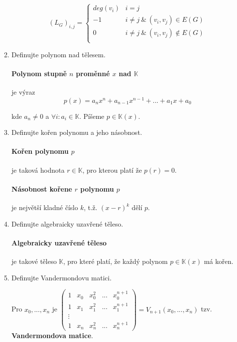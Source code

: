 \documentclass[10pt,a4paper]{article}
\theoremstyle{plain}
\begin{document}
\begin{enumerate}
\[ (L_G)_{i,j} = \begin{cases}  deg(v_i) & i = j  \\ 
								-1 & i \neq j \ \&\  (v_i, v_j) \in E(G) \\ 
								0  & i \neq j \ \&\  (v_i, v_j) \notin E(G) \\ \end{cases} \]

\item Definujte polynom nad tělesem.

\paragraph{Polynom stupně $n$ proměnné $x$ nad $\mathbb{K}$} je výraz
\[ p(x) = a_nx^n + a_{n-1}x^{n-1} + ... + a_1x + a_0\]

kde $a_n \neq 0$ a $\forall i: a_i \in \mathbb{K}$. Píšeme $p \in \mathbb{K}(x)$.

\item Definujte kořen polynomu a jeho násobnost.

\paragraph{Kořen polynomu $p$} je taková hodnota $r \in \mathbb{K}$, pro kterou platí že $p(r) = 0$.

\paragraph{Násobnost kořene $r$ polynomu $p$} je největší kladné číslo $k$, t.ž. $(x-r)^k$ dělí $p$.

\item Definujte algebraicky uzavřené těleso.

\paragraph{Algebraicky uzavřené těleso} je takové těleso $\mathbb{K}$, pro které platí, že každý polynom $p \in \mathbb{K}(x)$ má kořen.

\item Definujte Vandermondovu matici.


Pro $x_0, ..., x_n$ je $\begin{pmatrix}
1 & x_0 & x_0^2 & ... & x_0^{n+1} \\
1 & x_1 & x_1^2 & ... & x_1^{n+1} \\
\vdots &&& \\
1 & x_n & x_n^2 & ... & x_n^{n+1} 
\end{pmatrix} = V_{n+1}(x_0, ..., x_n)$ tzv. \textbf{Vandermondova matice}.


\end{enumerate}
\end{document}
